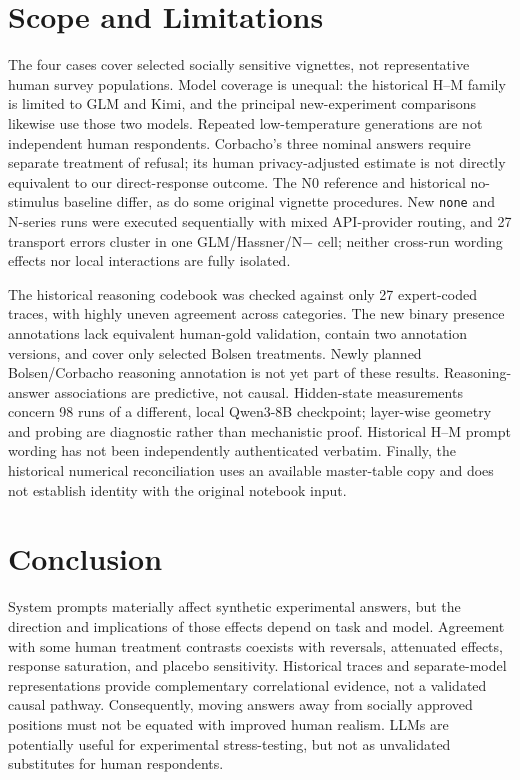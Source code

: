 \section{Scope and Limitations}

The four cases cover selected socially sensitive vignettes, not representative human survey populations. Model coverage is unequal: the historical H--M family is limited to GLM and Kimi, and the principal new-experiment comparisons likewise use those two models. Repeated low-temperature generations are not independent human respondents. Corbacho's three nominal answers require separate treatment of refusal; its human privacy-adjusted estimate is not directly equivalent to our direct-response outcome. The N0 reference and historical no-stimulus baseline differ, as do some original vignette procedures. New \texttt{none} and N-series runs were executed sequentially with mixed API-provider routing, and 27 transport errors cluster in one GLM/Hassner/N$-$ cell; neither cross-run wording effects nor local interactions are fully isolated.

The historical reasoning codebook was checked against only 27 expert-coded traces, with highly uneven agreement across categories. The new binary presence annotations lack equivalent human-gold validation, contain two annotation versions, and cover only selected Bolsen treatments. Newly planned Bolsen/Corbacho reasoning annotation is not yet part of these results. Reasoning-answer associations are predictive, not causal. Hidden-state measurements concern 98 runs of a different, local Qwen3-8B checkpoint; layer-wise geometry and probing are diagnostic rather than mechanistic proof. Historical H--M prompt wording has not been independently authenticated verbatim. Finally, the historical numerical reconciliation uses an available master-table copy and does not establish identity with the original notebook input.

\section{Conclusion}

System prompts materially affect synthetic experimental answers, but the direction and implications of those effects depend on task and model. Agreement with some human treatment contrasts coexists with reversals, attenuated effects, response saturation, and placebo sensitivity. Historical traces and separate-model representations provide complementary correlational evidence, not a validated causal pathway. Consequently, moving answers away from socially approved positions must not be equated with improved human realism. LLMs are potentially useful for experimental stress-testing, but not as unvalidated substitutes for human respondents.
